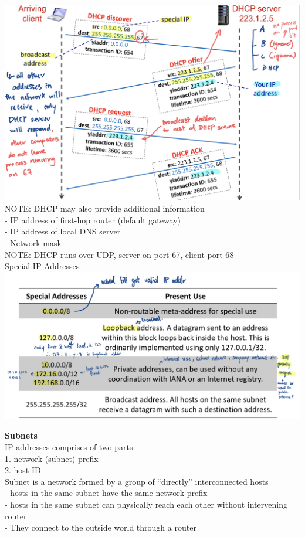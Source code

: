 \documentclass[10pt, a4paper]{article}
\newcommand{\blue}[1]{{\color{MidnightBlue}#1}}
\newcommand{\red}[1]{{\color{red}#1}}
\begin{document}
\begin{multicols*}{3}
		\includegraphics[scale=.15]{./assets/dhcp}
		\red{NOTE:} DHCP may also provide additional information\\
		- IP address of \blue{first-hop router} (default gateway)\\
		- IP address of \blue{local DNS server}\\
		- \blue{Network mask}\\
		\red{NOTE:} DHCP runs over UDP, server on port 67, client port 68\\

		Special IP Addresses\\
		\includegraphics[scale=.16]{./assets/specialIpAddr}

		\textbf{Subnets}\\
		IP addresses comprises of two parts:\\
		1. network (subnet) prefix\\
		2. host ID\\
		\red{Subnet} is a network formed by a group of ``directly'' interconnected hosts\\
		- hosts in the same subnet have the same network prefix\\
		- hosts in the same subnet can physically reach each other \blue{without intervening router}\\
		- They connect to the outside world through a router\\


\end{multicols*}
\end{document}

